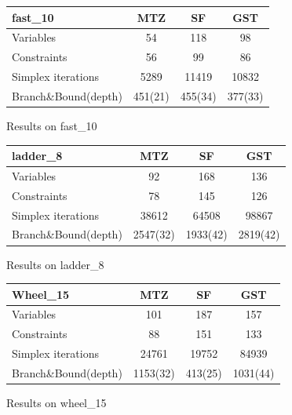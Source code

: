 \documentclass{article}
\begin{document}
\begin{figure}\centering

  \begin{tabular}{| l | c | c | c |}
    \hline
    fast\_10 & MTZ & SF & GST \\ \hline
    Variables & 54 & 118 & 98\\ \hline
    Constraints & 56 & 99 & 86\\ \hline
    Simplex iterations & 5289 & 11419 & 10832\\ \hline
    Branch\&Bound(depth) & 451(21) & 455(34) & 377(33)\\ \hline 
  \end{tabular}
  
  \caption{Results on fast\_10}
    \label{tab:fast}
\end{figure}
\begin{figure}
  \centering
  \begin{tabular}{| l | c | c | c |}
    \hline
    ladder\_8 & MTZ & SF & GST \\ \hline
    Variables & 92 & 168 & 136\\ \hline
    Constraints & 78 & 145 & 126\\ \hline
    Simplex iterations & 38612 & 64508 & 98867\\ \hline
    Branch\&Bound(depth) & 2547(32) & 1933(42) & 2819(42)\\ \hline 
  \end{tabular}
  
  \caption{Results on ladder\_8}
  \label{tab:ladder}
\end{figure}
\begin{figure}
  \centering
  \begin{tabular}{| l | c | c | c |}
    \hline
    Wheel\_15 & MTZ & SF & GST \\ \hline
    Variables & 101 & 187 & 157\\ \hline
    Constraints & 88 & 151 & 133\\ \hline
    Simplex iterations & 24761 & 19752 & 84939\\ \hline
    Branch\&Bound(depth) & 1153(32) & 413(25) & 1031(44)\\ \hline 
  \end{tabular}
  
  \caption{Results on wheel\_15}
  \label{tab:wheel}
\end{figure}


\newpage
\end{document}
